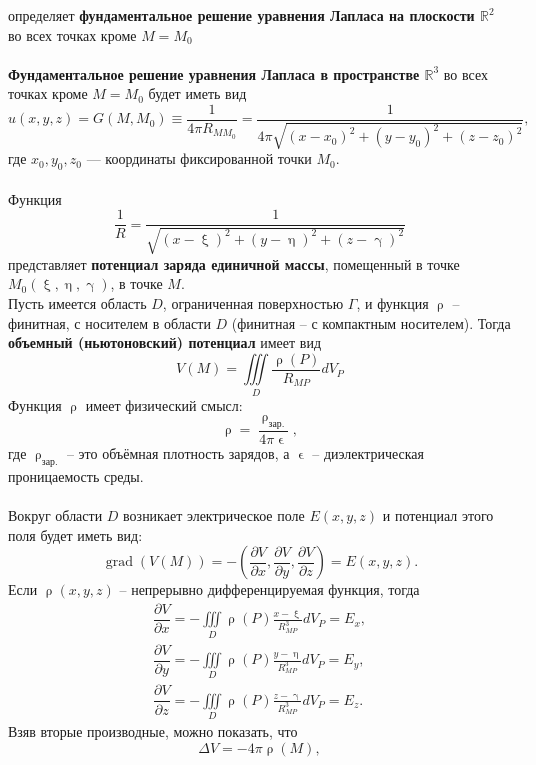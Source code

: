 \documentclass[a4paper, 12pt]{report}
\numberwithin{equation}{section}
\renewcommand{\gamma}{\upgamma}
\renewcommand{\eta}{\upeta}
\renewcommand{\xi}{\upxi}
\renewcommand{\rho}{\uprho}
\renewcommand{\varepsilon}{\upvarepsilon}
\newcommand{\pderiv}[2]{\dfrac{\partial #1}{\partial #2}}
\newcommand{\grad}{\operatorname{grad}}
\begin{document}
	определяет \textbf{фундаментальное решение уравнения Лапласа на плоскости $\mathbb R^2$} во всех точках кроме $M = M_0$
	\\\\
	\textbf{Фундаментальное решение уравнения Лапласа в пространстве $\mathbb R^3$} во всех точках кроме $M = M_0$ будет иметь вид
	\begin{equation}
		u(x, y, z) = G(M, M_0) \equiv \dfrac{1}{4\pi R_{MM_0}} =  \dfrac{1}{4\pi{\sqrt{(x-x_0)^2 + (y - y_0)^2 + (z - z_0)^2}}},
	\end{equation}
	где $x_0, y_0, z_0$ --- координаты фиксированной точки $M_0$.\\\\
	Функция \begin{equation}
		\frac{1}{R}=\frac{1}{\sqrt{(x-\xi)^2+(y-\eta)^2+(z-\gamma)^2}}
	\end{equation} представляет \textbf{потенциал заряда единичной массы}, помещенный в точке $M_0(\xi, \eta, \gamma)$, в точке $M$.\\
	Пусть имеется область $D$, ограниченная поверхностью $\Gamma$, и функция $\rho$ -- финитная, с носителем в области $D$ (финитная -- с компактным носителем).
	Тогда \textbf{объемный (ньютоновский) потенциал} имеет вид
	\begin{equation}
		V(M)=\iiint\limits_D\frac{\rho(P)}{R_{MP}}dV_P
	\end{equation}
	Функция $\rho$ имеет физический смысл:
	$$\rho=\frac{\rho_{\text{зар.}}}{4\pi \varepsilon},$$
	где $\rho_{\text{зар.}}$ -- это объёмная плотность зарядов, а $\varepsilon$ -- диэлектрическая проницаемость среды.\\\\
	Вокруг области $D$ возникает электрическое поле $E(x,y,z)$ и потенциал этого поля будет иметь вид:
	\begin{equation}
		\grad(V(M))=-\left(\pderiv{V}{x}, \pderiv{V}{y}, \pderiv{V}{z}\right)=E(x,y,z).
	\end{equation}
	Если $\rho(x,y,z)$ -- непрерывно дифференцируемая функция, тогда
	\begin{gather*}
		\pderiv{V}{x}=-\iiint\limits_D \rho(P)\frac{x-\xi}{R_{MP}^3}dV_P=E_x,\\
		\pderiv{V}{y}=-\iiint\limits_D\rho(P)\frac{y-\eta}{R_{MP}^3}dV_P=E_y,\\
		\pderiv{V}{z}=-\iiint\limits_D\rho(P)\frac{z-\gamma}{R_{MP}^3}dV_P=E_z.
	\end{gather*}
	Взяв вторые производные, можно показать, что
	\begin{equation}\label{4.13.1}
		\Delta V=-4\pi\rho(M),
	\end{equation}
\end{document}

